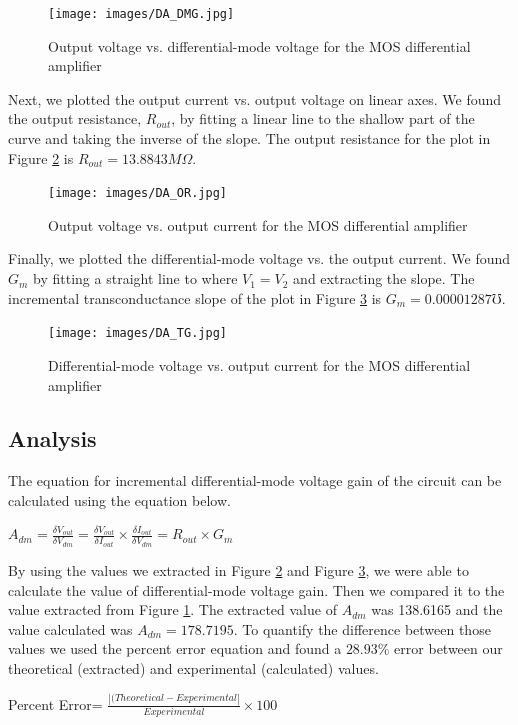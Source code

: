 \documentclass{article}
\begin{document}
\begin{figure}[H]
  \begin{center}      
  \texttt{[image: images/DA\_DMG.jpg]}
  \caption{Output voltage vs. differential-mode voltage for the MOS differential amplifier }   
  \label{fig:DMG2}
  \end{center}
\end{figure}

Next, we plotted the output current vs. output voltage on linear axes.  We found the output resistance, $R_{out}$, by fitting a linear line to the shallow part of the curve and taking the inverse of the slope.  The output resistance for the plot in Figure \ref{fig:OR2} is $R_{out} = 13.8843 M \Omega$.

\begin{figure}[H]
  \begin{center}      
  \texttt{[image: images/DA\_OR.jpg]}
  \caption{Output voltage vs. output current for the MOS differential amplifier}   
  \label{fig:OR2}
  \end{center}
\end{figure}

Finally, we plotted the differential-mode voltage vs. the output current.  We found $G_{m}$ by fitting a straight line to where $V_{1} = V_{2}$ and extracting the slope.  The incremental transconductance slope of the plot in Figure \ref{fig:TG2} is $G_{m} = 0.00001287  \mho
$.

\begin{figure}[H]
  \begin{center}      
  \texttt{[image: images/DA\_TG.jpg]}
  \caption{Differential-mode voltage vs. output current for the MOS differential amplifier}   
  \label{fig:TG2}
  \end{center}
\end{figure}
\subsection{Analysis}
 The equation for incremental differential-mode voltage gain of the circuit can be calculated using the equation below.
\begin{center}
 $A_{dm} = \frac{\delta V_{out}}{\delta V_{dm}} = \frac{\delta V_{out}}{\delta I_{out}} \times \frac{\delta I_{out}}{\delta V_{dm}} = R_{out} \times G_{m}$
   \end{center}
   
 By using the values we extracted in Figure \ref{fig:OR2} and Figure \ref{fig:TG2}, we were able to calculate the value of differential-mode voltage gain.  Then we compared it to the value extracted from Figure \ref{fig:DMG2}.  The extracted value of $A_{dm}$ was 138.6165 and the value calculated was $A_{dm} = 178.7195$.  To quantify the difference between those values we used the percent error equation and found a $28.93 \%$ error between our theoretical (extracted) and experimental (calculated) values. 
 \begin{center}
Percent Error= $\frac{|(Theoretical-Experimental|}{Experimental}\times 100$ 
 \end{center}
\end{document}
